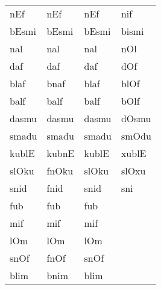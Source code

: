 \begin{appendix}
\begin{longtable}[t]{>{\raggedright\arraybackslash}p{10em}>{\raggedright\arraybackslash}p{10em}>{\raggedright\arraybackslash}p{10em}>{\raggedright\arraybackslash}p{10em}}
\hspace{1em}\hspace{1em}nEf & nEf & nEf & nif\\
\hspace{1em}\hspace{1em}bEsmi & bEsmi & bEsmi & bismi\\
\hspace{1em}\hspace{1em}nal & nal & nal & nOl\\
\hspace{1em}\hspace{1em}daf & daf & daf & dOf\\
\hspace{1em}\hspace{1em}blaf & bnaf & blaf & blOf\\
\hspace{1em}\hspace{1em}balf & balf & balf & bOlf\\
\hspace{1em}\hspace{1em}dasmu & dasmu & dasmu & dOsmu\\
\hspace{1em}\hspace{1em}smadu & smadu & smadu & smOdu\\
\hspace{1em}\hspace{1em}kublE & kubnE & kublE & xublE\\
\hspace{1em}\hspace{1em}slOku & fnOku & slOku & slOxu\\
\hspace{1em}\hspace{1em}snid & fnid & snid & sni\\
\hspace{1em}\hspace{1em}fub & fub & fub & \\
\hspace{1em}\hspace{1em}mif & mif & mif & \\
\hspace{1em}\hspace{1em}lOm & lOm & lOm & \\
\hspace{1em}\hspace{1em}snOf & fnOf & snOf & \\
\hspace{1em}\hspace{1em}blim & bnim & blim & \\

\end{longtable}
\end{appendix}
